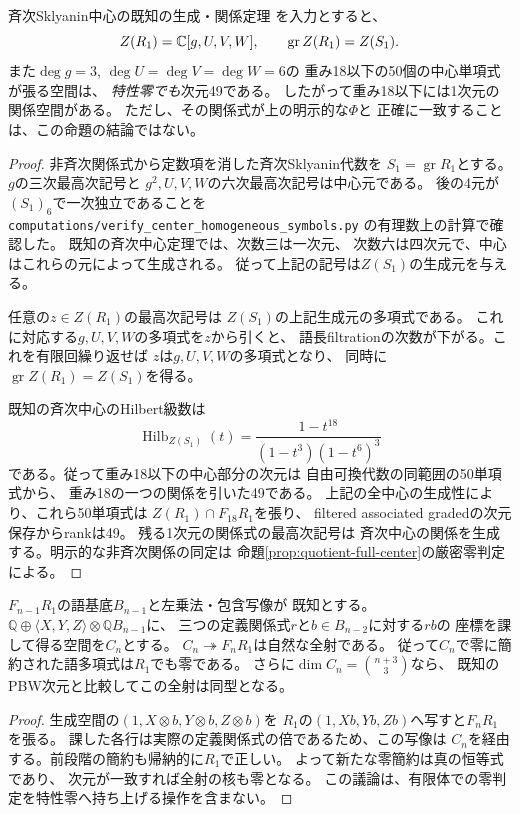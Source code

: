 \begin{proposition}
\label{prop:quotient-generators-graded}
斉次Sklyanin中心の既知の生成・関係定理
\cite[Proposition~2.31 and \S8.2]{WWYSklyanin}を入力とすると、
\[
 Z(R_1)=\mathbb C[g,U,V,W],\qquad
 \operatorname{gr}Z(R_1)=Z(S_1).
\]
また$\deg g=3$, $\deg U=\deg V=\deg W=6$の
重み18以下の50個の中心単項式が張る空間は、
\emph{特性零でも}次元49である。
したがって重み18以下には1次元の関係空間がある。
ただし、その関係式が上の明示的な$\Phi$と
正確に一致することは、この命題の結論ではない。
\end{proposition}
\begin{proof}
非斉次関係式から定数項を消した斉次Sklyanin代数を
$S_1=\operatorname{gr}R_1$とする。
$g$の三次最高次記号と
$g^2,U,V,W$の六次最高次記号は中心元である。
後の4元が$(S_1)_6$で一次独立であることを
\texttt{computations/verify\_center\_homogeneous\_symbols.py}
の有理数上の計算で確認した。
既知の斉次中心定理では、次数三は一次元、
次数六は四次元で、中心はこれらの元によって生成される。
従って上記の記号は$Z(S_1)$の生成元を与える。

任意の$z\in Z(R_1)$の最高次記号は
$Z(S_1)$の上記生成元の多項式である。
これに対応する$g,U,V,W$の多項式を$z$から引くと、
語長filtrationの次数が下がる。これを有限回繰り返せば
$z$は$g,U,V,W$の多項式となり、
同時に$\operatorname{gr}Z(R_1)=Z(S_1)$を得る。

既知の斉次中心のHilbert級数は
\[
 \operatorname{Hilb}_{Z(S_1)}(t)
 =\frac{1-t^{18}}{(1-t^3)(1-t^6)^3}
\]
である。従って重み18以下の中心部分の次元は
自由可換代数の同範囲の50単項式から、
重み18の一つの関係を引いた49である。
上記の全中心の生成性により、これら50単項式は
$Z(R_1)\cap F_{18}R_1$を張り、
filtered associated gradedの次元保存からrankは49。
残る1次元の関係式の最高次記号は
斉次中心の関係を生成する。明示的な非斉次関係の同定は
命題\ref{prop:quotient-full-center}の厳密零判定による。
\end{proof}

\begin{lemma}[再帰的な有限語商の証明上の意味]
\label{lem:quotient-recursive-certificate}
$F_{n-1}R_1$の語基底$B_{n-1}$と左乗法・包含写像が
既知とする。$\mathbb Q\oplus
\langle X,Y,Z\rangle\otimes\mathbb Q B_{n-1}$に、
三つの定義関係式$r$と$b\in B_{n-2}$に対する$rb$の
座標を課して得る空間を$C_n$とする。
$C_n\twoheadrightarrow F_nR_1$は自然な全射である。
従って$C_n$で零に簡約された語多項式は$R_1$でも零である。
さらに$\dim C_n=\binom{n+3}{3}$なら、
既知のPBW次元と比較してこの全射は同型となる。
\end{lemma}
\begin{proof}
生成空間の$(1,X\otimes b,Y\otimes b,Z\otimes b)$を
$R_1$の$(1,Xb,Yb,Zb)$へ写すと$F_nR_1$を張る。
課した各行は実際の定義関係式の倍であるため、この写像は
$C_n$を経由する。前段階の簡約も帰納的に$R_1$で正しい。
よって新たな零簡約は真の恒等式であり、
次元が一致すれば全射の核も零となる。
この議論は、有限体での零判定を特性零へ持ち上げる操作を含まない。
\end{proof}

